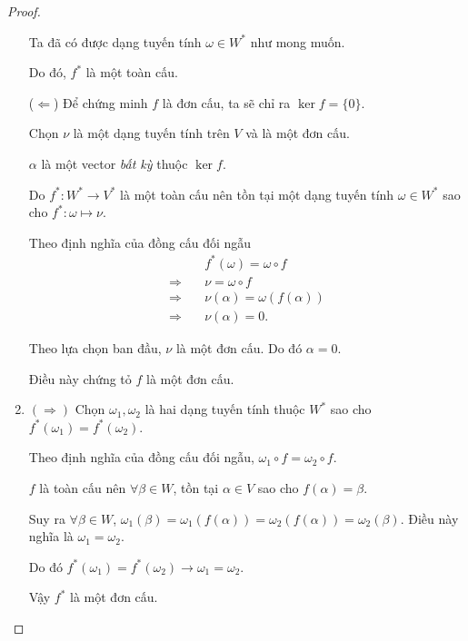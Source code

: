 \documentclass[class=nhvh-linear-algebra,crop=false]{standalone}
\begin{document}
\begin{proof}
\begin{enumerate}[label = (\arabic*)]
              \par Ta đã có được dạng tuyến tính $\omega\in W^{*}$ như mong muốn.
              \par Do đó, $f^{*}$ là một toàn cấu.
              \bigskip
              \par ($\Leftarrow$) Để chứng minh $f$ là đơn cấu, ta sẽ chỉ ra $\ker f = \{0\}$.
              \par Chọn $\nu$ là một dạng tuyến tính trên $V$ và là một đơn cấu.
              \par $\alpha$ là một vector \textit{bất kỳ} thuộc $\ker f$.
              \par Do $f^{*}: {W}^{*} \to {V}^{*}$ là một toàn cấu nên tồn tại một dạng tuyến tính $\omega \in {W}^{*}$ sao cho ${f}^{*}: \omega \mapsto \nu$.
              \par Theo định nghĩa của đồng cấu đối ngẫu
              \begin{align*}
                                   & {f}^{*}(\omega) = \omega\circ f  \\
                  \Rightarrow\quad & \nu = \omega\circ f              \\
                  \Rightarrow\quad & \nu (\alpha) = \omega(f(\alpha)) \\
                  \Rightarrow\quad & \nu (\alpha) = 0.
              \end{align*}
              \par Theo lựa chọn ban đầu, $\nu$ là một đơn cấu. Do đó $\alpha = 0$.
              \par Điều này chứng tỏ $f$ là một đơn cấu.
        \item \par $(\Rightarrow)$ Chọn $\omega_{1}, \omega_{2}$ là hai dạng tuyến tính thuộc ${W}^{*}$ sao cho ${f}^{*}(\omega_{1}) = {f}^{*}(\omega_{2})$.
              \par Theo định nghĩa của đồng cấu đối ngẫu, $\omega_{1}\circ f = \omega_{2}\circ f$.
              \par $f$ là toàn cấu nên $\forall\beta\in W$, tồn tại $\alpha\in V$ sao cho $f(\alpha) = \beta$.
              \par Suy ra $\forall\beta\in W$, $\omega_{1}(\beta) = \omega_{1}(f(\alpha)) = \omega_{2}(f(\alpha)) = \omega_{2}(\beta)$. Điều này nghĩa là $\omega_{1} = \omega_{2}$.
              \par Do đó ${f}^{*}(\omega_{1}) = {f}^{*}(\omega_{2}) \rightarrow \omega_{1} = \omega_{2}$.
              \par Vậy ${f}^{*}$ là một đơn cấu.

\end{enumerate}
\end{proof}
\end{document}
